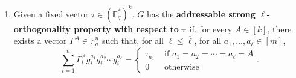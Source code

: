 \documentclass[11pt]{article}
\theoremstyle{definition}
\renewcommand{\le}{\leqslant}
\newcommand{\FF}{\mathbb{F}}
\newcommand*{\ol}{\overline}
\begin{document}
\begin{enumerate}[(1)]
    \item Given a fixed vector $\tau \in (\mathbb{F}_q^*)^k$, $G$ has the \textbf{addressable strong $\ol\ell$-orthogonality property with respect to }$\boldsymbol{\tau}$ if, for every $A\in [k]$, there exists a vector $\Gamma^A\in \FF_q^n$ such that, for all $\ell \le \ol\ell$, for all $a_1, \ldots, a_\ell \in [m]$,
    \begin{equation}~\label{eq:address_strong_mult_prop}
        \sum_{i=1}^n \Gamma^A_{i}{g}^{a_1}_i {g}^{a_2}_i\cdots  {g}^{a_{\ell}}_i = 
        \begin{cases}
            \tau_{a_1} &\text{ if $a_1 = a_2 = \cdots = a_{\ell} = A$} \\
            0 &\text{ otherwise}
        \end{cases}.
    \end{equation}
\end{enumerate}
\end{document}
